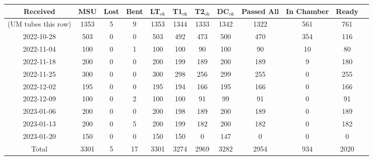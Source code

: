 \begin{tabular}{|c|c|c|c|c|c|c|c|c|c|c|c|}
\hline
           Received &  MSU &  Lost &  Bent &  LT$_\text{ok}$ &  T1$_\text{ok}$ &  T2$_\text{ok}$ &  DC$_\text{ok}$ &  Passed All &  In Chamber &  Ready \\\hline

(UM tubes this row) & 1353 &     5 &     9 &            1353 &            1344 &            1333 &            1342 &        1322 &         561 &    761 \\\hline
         2022-10-28 &  503 &     0 &     0 &             503 &             492 &             473 &             500 &         470 &         354 &    116 \\\hline
         2022-11-04 &  100 &     0 &     1 &             100 &             100 &              90 &             100 &          90 &          10 &     80 \\\hline
         2022-11-18 &  200 &     0 &     0 &             200 &             199 &             189 &             200 &         189 &           9 &    180 \\\hline
         2022-11-25 &  300 &     0 &     0 &             300 &             298 &             256 &             299 &         255 &           0 &    255 \\\hline
         2022-12-02 &  195 &     0 &     0 &             195 &             194 &             166 &             195 &         166 &           0 &    166 \\\hline
         2022-12-09 &  100 &     0 &     2 &             100 &             100 &              91 &              99 &          91 &           0 &     91 \\\hline
         2023-01-06 &  200 &     0 &     0 &             200 &             198 &             189 &             200 &         189 &           0 &    189 \\\hline
         2023-01-13 &  200 &     0 &     5 &             200 &             199 &             182 &             200 &         182 &           0 &    182 \\\hline
         2023-01-20 &  150 &     0 &     0 &             150 &             150 &               0 &             147 &           0 &           0 &      0 \\\hline
              Total & 3301 &     5 &    17 &            3301 &            3274 &            2969 &            3282 &        2954 &         934 &   2020 \\\hline

\end{tabular}
